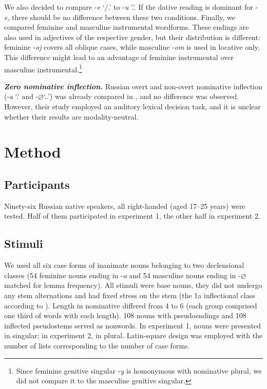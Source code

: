 \documentclass[output=paper, modfonts,newtxmath,hidelinks]{langscibook}
\begin{document}
We also decided to compare -\textit{e} `\datt/\locc.\fem' to -\textit{u} '\datt.\masc'. If the dative reading is dominant for -\textit{e}, there should be no difference between these two conditions. Finally, we compared feminine and masculine instrumental wordforms. These endings are also used in adjectives of the respective gender, but their distribution is different: feminine -\textit{oj} covers all oblique cases, while masculine -\textit{om} is used in locative only. This difference might lead to an advantage of feminine instrumental over masculine instrumental.\footnote{ Since feminine genitive singular -\textit{y} is homonymous with nominative plural, we did not compare it to the masculine genitive singular.}

\textbf{\textit{Zero nominative inflection.}} Russian overt and non-overt nominative inflection (-\textit{a} `\nomm.\fem' and -\textit{$\varnothing$}`\nomm.\accc.\masc') was already compared in \citet{gor2017processing}, and no difference was observed. However, their study employed an auditory lexical decision task, and it is unclear whether their results are modality-neutral.

\section{Method}
\subsection{Participants} Ninety-six Russian native speakers, all right-handed (aged 17–25 years) were tested. Half of them participated in experiment 1, the other half in experiment 2.

\subsection{Stimuli} We used all six case forms of inanimate nouns belonging to two declensional classes (54 feminine nouns ending in -\textit{a} and 54 masculine nouns ending in -\textit{$\varnothing$} matched for lemma frequency). All stimuli were base nouns, they did not undergo any stem alternations and had fixed stress on the stem (the 1a inflectional class according to \citealt{zaliznyak1977grammatical}). Length in nominative differed from 4 to 6 (each group comprised one third of words with each length). 108 nouns with pseudoendings and 108 inflected pseudostems served as nonwords. In experiment 1, nouns were presented in singular; in experiment 2, in plural. Latin-square design was employed with the number of lists corresponding to the number of case forms.
\end{document}
